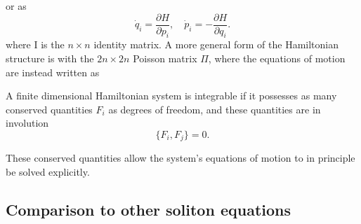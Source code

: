 \documentclass[english,master]{liumaiex}
\theoremstyle{plain}
\theoremstyle{definition}
\begin{document}
%
or as
%
\begin{equation}
	\dot{q}_i = \frac{\partial H}{\partial p_i}, \quad
	\dot{p}_i = -\frac{\partial H}{\partial q_i}.
\end{equation}
%
where I is the $n \times n$ identity matrix. A more general form of the Hamiltonian structure is with the $2n \times 2n$ Poisson matrix $\Pi$, where the equations of motion are instead written as

A finite dimensional Hamiltonian system is integrable if it possesses as many conserved quantities $F_i$ as degrees of freedom, and these quantities are in involution
%
\begin{equation}
	\{F_i, F_j\} = 0.
\end{equation}

These conserved quantities allow the system's equations of motion to in principle be solved explicitly. 

\subsection{Comparison to other soliton equations}
\end{document}
